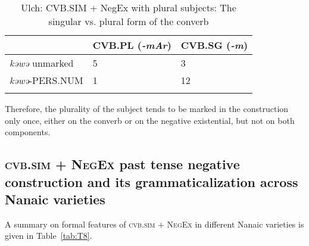 \documentclass[output=paper]{langscibook}
\begin{document}
\begin{table}[!h]
    \caption{Ulch: CVB.SIM + NegEx with plural subjects: The singular vs. plural form of the converb}
    \label{tab:T7}
    \begin{tabular}{@{}lll@{}}
    \lsptoprule
     & CVB.PL (\textit{-mAr}) & CVB.SG (\textit{-m}) \\ \midrule
    \textit{kəwə} unmarked & 5 & 3 \\
    \textit{kəwə}-PERS.NUM & 1 & 12 \\ \lspbottomrule
    \end{tabular}
\end{table}

Therefore, the plurality of the subject tends to be marked in the construction only once, either on the converb or on the negative existential, but not on both components.

\subsection{\textsc{cvb.sim + NegEx} past tense negative construction and its grammaticalization across Nanaic varieties}\label{sec:T5.5}

A summary on formal features of \textsc{cvb.sim + NegEx} in different Nanaic varieties is given in Table \ref{tab:T8}.
\end{document}
